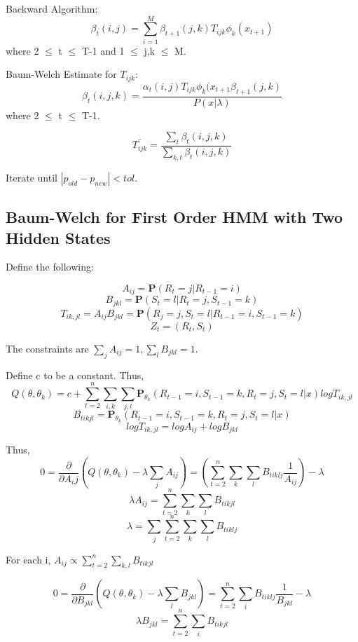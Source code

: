 \documentclass{article} %
\begin{document}
Backward Algorithm: \newline
$$\beta_t(i,j) = \sum_{i=1}^M \beta_{t+1}(j,k) T_{ijk} \phi_k(x_{t+1})$$
where 2 $\leq$ t $\leq$ T-1 and 1 $\leq$ j,k $\leq$ M. \newline

Baum-Welch Estimate for $T_{ijk}$: \newline
$$\beta_t(i,j,k) = \frac{\alpha_t(i,j) T_{ijk} \phi_k(x_{t+1} \beta_{t+1}(j,k)}{P(x|\lambda)}$$ 
where 2 $\leq$ t $\leq$ T-1. \newline

$$\bar{T_{ijk}} = \frac{\sum_t \beta_t (i,j,k)}{\sum_{k,t} \beta_t (i,j,k)}$$

Iterate until $|p_{old} - p_{new}| < tol$. 

\subsection{Baum-Welch for First Order HMM with Two Hidden States}

Define the following:

$$A_{ij} = \textbf{P} (R_t = j | R_{t-1} = i)$$
$$B_{jkl} = \textbf{P} (S_t = l | R_t = j, S_{t-1} = k)$$ 
$$T_{ik, jl} = A_{ij} B_{jkl} = \textbf{P} (R_j = j, S_t = l | R_{t-1} = i, S_{t-1} = k)$$
$$Z_t = (R_t, S_t)$$

The constraints are $\sum_j A_{ij} = 1, \sum_l B_{jkl} = 1.$ \newline

Define c to be a constant. Thus,  \newline
$$Q(\theta, \theta_k) = c + \sum_{t=2}^n \sum_{i,k} \sum_{j,l} \textbf{P}_{\theta_k} (R_{t-1} = i, S_{t-1} = k, R_t = j, S_t = l | x) log T_{ik, jl}$$ 
$$B_{tikjl} = \textbf{P}_{\theta_k} (R_{t-1} = i, S_{t-1} = k, R_t = j, S_t = l | x)$$
$$log T_{ik, jl} = log A_{ij} + log B_{jkl}$$

Thus, \newline
$$ 0 = \frac{\partial}{\partial A_ij}(Q(\theta, \theta_k) - \lambda \sum_{j} A_{ij}) = (\sum_{t=2}^n \sum_k \sum_l B_{tiklj} \frac{1}{A_{ij}}) - \lambda$$
$$\lambda A_{ij} = \sum_{t=2}^n \sum_k \sum_l B_{tikjl}$$
$$\lambda = \sum_j \sum_{t=2}^n \sum_k \sum_l B_{tiklj}$$

For each i, $A_{ij} \propto \sum_{t=2}^n \sum_{k,l} B_{tikjl}$ \newline

$$ 0 = \frac{\partial}{\partial B_{jkl}} (Q(\theta, \theta_k) - \lambda \sum_l B_{jkl}) = \sum_{t=2}^n \sum_i B_{tiklj} \frac{1}{B_{jkl}} - \lambda$$
$$ \lambda B_{jkl} = \sum_{t=2}^n \sum_i B_{tikjl}$$
\end{document}
